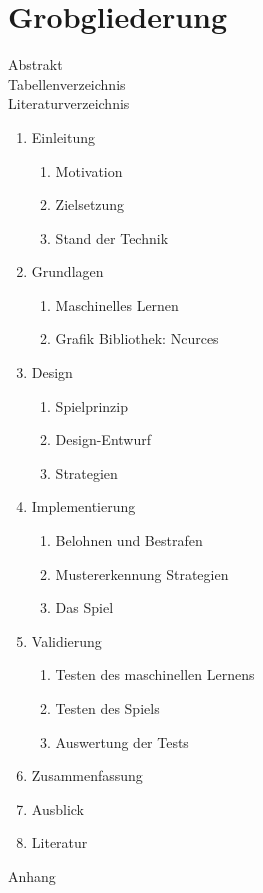 \documentclass[12pt,a4paper]{article}
\begin{document}
\section*{Grobgliederung}
Abstrakt\\
Tabellenverzeichnis\\
Literaturverzeichnis
\begin{enumerate}
	\item Einleitung
	\begin{enumerate}
		\item Motivation
		\item Zielsetzung
		\item Stand der Technik
	\end{enumerate}
	\item Grundlagen
	\begin{enumerate}
		\item Maschinelles Lernen
		\item Grafik Bibliothek: Ncurces
	\end{enumerate}
	\item Design
	\begin{enumerate}
		\item Spielprinzip
		\item Design-Entwurf
		\item Strategien
	\end{enumerate}
	\item Implementierung
	\begin{enumerate}
		\item Belohnen und Bestrafen
		\item Mustererkennung Strategien
		\item Das Spiel 
	\end{enumerate}
	\item Validierung
	\begin{enumerate}
		\item Testen des maschinellen Lernens
		\item Testen des Spiels
		\item Auswertung der Tests
	\end{enumerate}
	\item Zusammenfassung
	\item Ausblick
	\item Literatur	
\end{enumerate}
Anhang


\nocite{*}
\printbibliography
\end{document}
